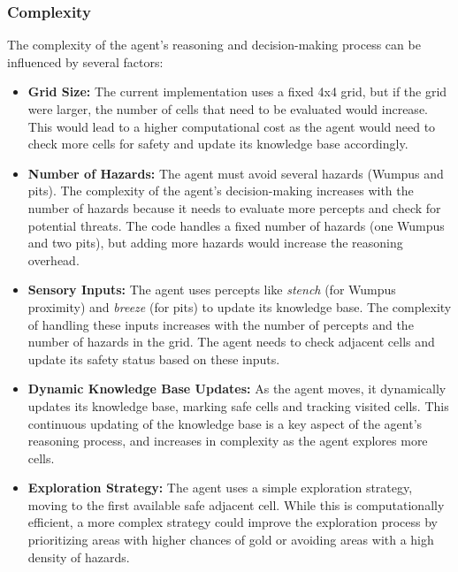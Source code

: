 \documentclass[12pt]{article}
\begin{document}
\subsubsection{Complexity}
The complexity of the agent’s reasoning and decision-making process can be influenced by several factors:

\begin{itemize}
    \item \textbf{Grid Size:} The current implementation uses a fixed 4x4 grid, but if the grid were larger, the number of cells that need to be evaluated would increase. This would lead to a higher computational cost as the agent would need to check more cells for safety and update its knowledge base accordingly.
    
    \item \textbf{Number of Hazards:} The agent must avoid several hazards (Wumpus and pits). The complexity of the agent’s decision-making increases with the number of hazards because it needs to evaluate more percepts and check for potential threats. The code handles a fixed number of hazards (one Wumpus and two pits), but adding more hazards would increase the reasoning overhead.
    
    \item \textbf{Sensory Inputs:} The agent uses percepts like \textit{stench} (for Wumpus proximity) and \textit{breeze} (for pits) to update its knowledge base. The complexity of handling these inputs increases with the number of percepts and the number of hazards in the grid. The agent needs to check adjacent cells and update its safety status based on these inputs.
    
    \item \textbf{Dynamic Knowledge Base Updates:} As the agent moves, it dynamically updates its knowledge base, marking safe cells and tracking visited cells. This continuous updating of the knowledge base is a key aspect of the agent's reasoning process, and increases in complexity as the agent explores more cells.
    
    \item \textbf{Exploration Strategy:} The agent uses a simple exploration strategy, moving to the first available safe adjacent cell. While this is computationally efficient, a more complex strategy could improve the exploration process by prioritizing areas with higher chances of gold or avoiding areas with a high density of hazards.
\end{itemize}
\end{document}
